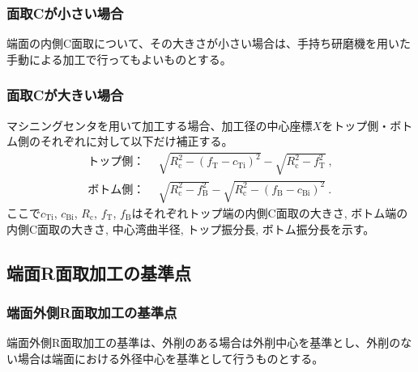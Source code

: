 \subsubsection{面取Cが小さい場合}
端面の内側C面取について、その大きさが小さい場合は、手持ち研磨機を用いた手動による加工で行ってもよいものとする。

\subsubsection{面取Cが大きい場合}
マシニングセンタを用いて加工する場合、加工径の中心座標$X$をトップ側・ボトム側のそれぞれに対して以下だけ補正する。
\begin{align*}
  \text{トップ側：}&~~
  \sqrt{R_\mathrm c^2-\left(f_\mathrm T-c_\mathrm{Ti}\right)^2}-\sqrt{R_\mathrm c^2-f_\mathrm T^2}\ ,\\
  \text{ボトム側：}&~~
  \sqrt{R_\mathrm c^2-f_\mathrm B^2}-\sqrt{R_\mathrm c^2-\left(f_\mathrm B-c_\mathrm{Bi}\right)^2}\ .
\end{align*}
ここで$c_\mathrm{Ti}$, $c_\mathrm{Bi}$, $R_\mathrm c$, $f_\mathrm T$, $f_\mathrm B$はそれぞれトップ端の内側C面取の大きさ, ボトム端の内側C面取の大きさ, 中心湾曲半径, トップ振分長, ボトム振分長を示す。



\clearpage


\subsection{端面R面取加工の基準点}

\subsubsection{端面外側R面取加工の基準点}
端面外側R面取加工の基準は、外削のある場合は外削中心を基準とし、外削のない場合は端面における外径中心を基準として行うものとする。

